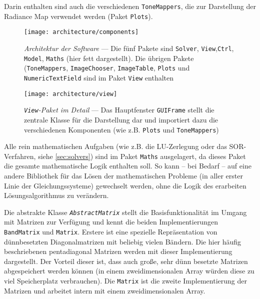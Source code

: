 Darin enthalten sind auch die verschiedenen \texttt{ToneMappers}, die zur Darstellung der \gls{Radiance Map} verwendet werden (Paket \texttt{Plots}).

\begin{figure}
  \begin{center}
    \texttt{[image: architecture/components]}
    \caption{\textit{Architektur der Software} --- Die fünf Pakete sind \texttt{Solver}, \texttt{View},\texttt{Ctrl}, \texttt{Model}, \texttt{Maths} (hier fett dargestellt).  Die übrigen Pakete (\texttt{ToneMappers}, \texttt{ImageChooser}, \texttt{ImageTable}, \texttt{Plots} und \texttt{NumericTextField} sind im Paket \texttt{View} enthalten}
    \label{fig:arch:components}
  \end{center}
\end{figure}


\begin{figure}
  \begin{center}
    \texttt{[image: architecture/view]}
    \caption{\textit{\texttt{View}-Paket im Detail} --- Das Hauptfenster \texttt{GUIFrame} stellt die zentrale Klasse für die Darstellung dar und importiert dazu die verschiedenen Komponenten (wie z.B. \texttt{Plots} und \texttt{ToneMappers})}
    \label{fig:arch:view}
  \end{center}
\end{figure}

Alle rein mathematischen Aufgaben (wie z.B. die LU-Zerlegung oder das SOR-Verfahren, siehe \autoref{sec:solvers}) sind im Paket \texttt{Maths} ausgelagert, da dieses Paket die gesamte mathematische Logik enthalten soll. So kann -- bei Bedarf -- auf eine andere Bibliothek für das Lösen der mathematischen Probleme (in aller erster Linie der Gleichungssysteme) gewechselt werden, ohne die Logik des erarbeiten Lösungsalgorithmus zu verändern. 

Die abstrakte Klasse \textit{\texttt{AbstractMatrix}} stellt die Basisfunktionalität im Umgang mit Matrizen zur Verfügung und kennt die beiden Implementierungen \texttt{BandMatrix} und \texttt{Matrix}. Erstere ist eine spezielle Repräsentation von dünnbesetzten Diagonalmatrizen mit beliebig vielen Bändern. Die hier häufig beschriebenen pentadiagonal Matrizen werden mit dieser Implementierung dargestellt. Der Vorteil dieser ist, dass auch große, sehr dünn besetzte Matrizen abgespeichert werden können (in einem zweidimensionalen Array würden diese zu viel Speicherplatz verbrauchen). Die \texttt{Matrix} ist die zweite Implementierung der Matrizen und arbeitet intern mit einem zweidimensionalen Array.


